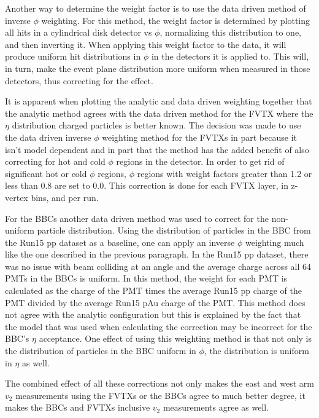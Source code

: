 Another way to determine the weight factor is to use the data driven method of inverse $\phi$ weighting. For this method, the weight factor is determined by plotting all hits in a cylindrical disk detector vs $\phi$, normalizing this distribution to one, and then inverting it. When applying this weight factor to the data, it will produce uniform hit distributions in $\phi$ in the detectors it is applied to. This will, in turn, make the event plane distribution more uniform when measured in those detectors, thus correcting for the effect.

It is apparent when plotting the analytic and data driven weighting together that the analytic method agrees with the data driven method for the FVTX where the $\eta$ distribution charged particles is better known. The decision was made to use the data driven inverse $\phi$ weighting method for the FVTXs in part because it isn't model dependent and in part that the method has the added benefit of also correcting for hot and cold $\phi$ regions in the detector. In order to get rid of significant hot or cold $\phi$ regions, $\phi$ regions with weight factors greater than 1.2 or less than 0.8 are set to 0.0. This correction is done for each FVTX layer, in z-vertex bins, and per run.

For the BBCs another data driven method was used to correct for the non-uniform particle distribution. Using the distribution of particles in the BBC from the Run15 pp dataset as a baseline, one can apply an inverse $\phi$ weighting much like the one described in the previous paragraph. In the Run15 pp dataset, there was no issue with beam colliding at an angle and the average charge across all 64 PMTs in the BBCs is uniform. In this method, the weight for each PMT is calculated as the charge of the PMT times the average Run15 pp charge of the PMT divided by the average Run15 pAu charge of the PMT. This method does not agree with the analytic configuration but this is explained by the fact that the model that was used when calculating the correction may be incorrect for the BBC's $\eta$ acceptance. One effect of using this weighting method is that not only is the distribution of particles in the BBC uniform in $\phi$, the distribution is uniform in $\eta$ as well.

The combined effect of all these corrections not only makes the east and west arm $v_2$ measurements using the FVTXs or the BBCs agree to much better degree, it makes the BBCs and FVTXs inclusive $v_2$ measurements agree as well.

